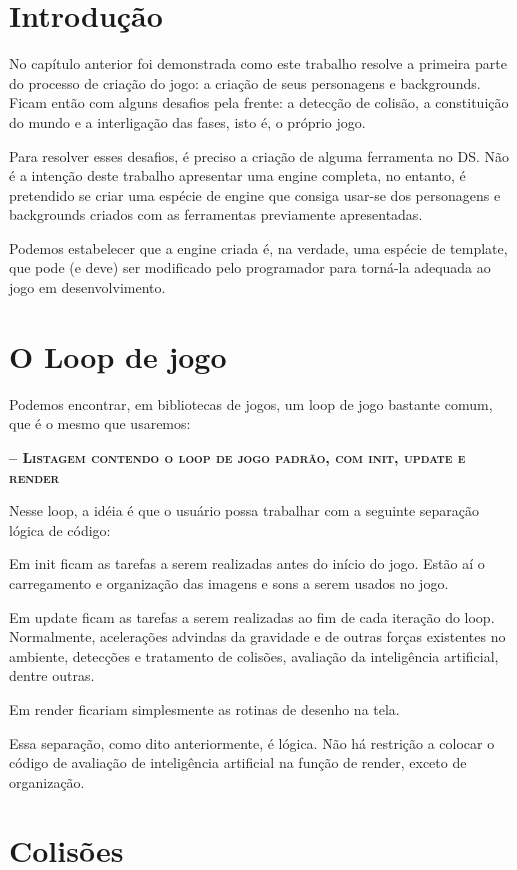 \documentclass[brazil]{abnt}
\begin{document}
\section{Introdução}

No capítulo anterior foi demonstrada como este trabalho resolve a primeira parte do processo de criação do jogo: a criação de seus personagens e backgrounds. Ficam então com alguns desafios pela frente: a detecção de colisão, a constituição do mundo e a interligação das fases, isto é, o próprio jogo.

Para resolver esses desafios, é preciso a criação de alguma ferramenta no DS. Não é a intenção deste trabalho apresentar uma engine completa, no entanto, é pretendido se criar uma espécie de engine que consiga usar-se dos personagens e backgrounds criados com as ferramentas previamente apresentadas.

Podemos estabelecer que a engine criada é, na verdade, uma espécie de template, que pode (e deve) ser modificado pelo programador para torná-la adequada ao jogo em desenvolvimento.

\section{O Loop de jogo}

Podemos encontrar, em bibliotecas de jogos, um loop de jogo bastante comum, que é o mesmo que usaremos:

\textsc{\textbf{-- Listagem contendo o loop de jogo padrão, com init, update e render}}

Nesse loop, a idéia é que o usuário possa trabalhar com a seguinte separação lógica de código:

Em init ficam as tarefas a serem realizadas antes do início do jogo. Estão aí o carregamento e organização das imagens e sons a serem usados no jogo. 

Em update ficam as tarefas a serem realizadas ao fim de cada iteração do loop. Normalmente, acelerações advindas da gravidade e de outras forças existentes no ambiente, detecções e tratamento de colisões, avaliação da inteligência artificial, dentre outras.

Em render ficariam simplesmente as rotinas de desenho na tela.

Essa separação, como dito anteriormente, é lógica. Não há restrição a colocar o código de avaliação de inteligência artificial na função de render, exceto de organização.

\section{Colisões}
\end{document}
